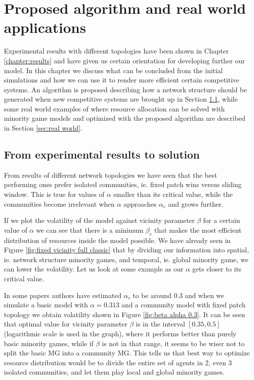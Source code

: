 \chapter{Proposed algorithm and real world applications}
\label{chapter:algorithm}

Experimental results with different topologies have been shown in Chapter \ref{chapter:results} and have given us certain orientation for developing further our model.
In this chapter we discuss what can be concluded from the initial simulations and how we can use it to render more efficient certain competitive systems.
An algorithm is proposed describing how a network structure should be generated when new competitive systems are brought up in Section \ref{sec:proposed algorithm}, while some real world examples of where resource allocation can be solved with minority game models and optimized with the proposed algorithm are described in Section \ref{sec:real world}.

\section{From experimental results to solution}
\label{sec:proposed algorithm}

From results of different network topologies we have seen that the best performing ones prefer isolated communities, ie. fixed patch wins versus sliding window.
This is true for values of $\alpha$ smaller than its critical value, while the communities become irrelevant when $\alpha$ approaches $\alpha_c$ and grows further.

If we plot the volatility of the model against vicinity parameter $\beta$ for a certain value of $\alpha$ we can see that there is a minimum $\beta_c$ that makes the most efficient distribution of resources inside the model possible.
We have already seen in Figure \ref{fig:fixed vicinity full classic} that by dividing our information into spatial, ie. network structure minority games, and temporal, ie. global minority game, we can lower the volatility.
Let us look at some example as our $\alpha$ gets closer to its critical value.

In some papers authors have estimated $\alpha_c$ to be around $0.3$ and when we simulate a basic model with $\alpha=0.313$ and a community model with fixed patch topology we obtain volatility shown in Figure \ref{fig:beta alpha 0.3}.
It can be seen that optimal value for vicinity parameter $\beta$ is in the interval $[0.35,0.5]$ (logarithmic scale is used in the graph), where it performs better than purely basic minority games, while if $\beta$ is not in that range, it seems to be wiser not to split the basic MG into a community MG.
This tells us that best way to optimize resource distribution would be to divide the entire set of agents in 2, even 3 isolated communities, and let them play local and global minority games.


